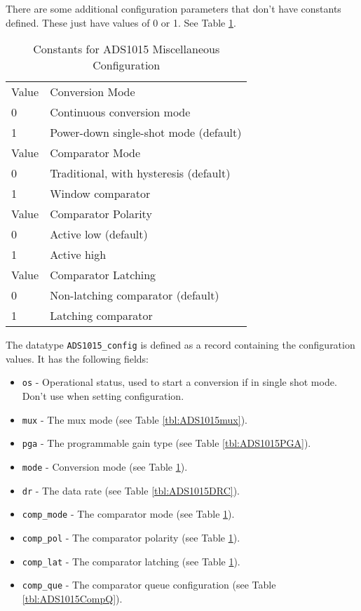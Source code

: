 \documentclass[10pt, openany]{book}
\newcommand{\datatype}[1]{\texttt{#1}}
\begin{document}
There are some additional configuration parameters that don't have constants defined.  These just have values of 0 or 1.  See Table \ref{tbl:ADS1015Misc}.

\begin{table}[!h]
\begin{center}
  \begin{tabular}{l|l}
    Value & Conversion Mode \\
    0 & Continuous conversion mode \\
    1 & Power-down single-shot mode (default) \\
    \hline
    Value & Comparator Mode \\
    0 & Traditional, with hysteresis (default) \\
    1 & Window comparator \\
    \hline
    Value & Comparator Polarity \\
    0 & Active low (default) \\
    1 & Active high \\
    \hline
    Value & Comparator Latching \\
    0 & Non-latching comparator (default) \\
    1 & Latching comparator \\
  \end{tabular}
  \caption{Constants for ADS1015 Miscellaneous Configuration}
  \label{tbl:ADS1015Misc}
\end{center}
\end{table}

The datatype \datatype{ADS1015\_config} is defined as a record containing the configuration values.  It has the following fields:
\begin{itemize}
    \item \datatype{os} - Operational status, used to start a conversion if in single shot mode.  Don't use when setting configuration.
    \item \datatype{mux} - The mux mode (see Table \ref{tbl:ADS1015mux}).
    \item \datatype{pga} - The programmable gain type (see Table \ref{tbl:ADS1015PGA}).
    \item \datatype{mode} - Conversion mode (see Table \ref{tbl:ADS1015Misc}).
    \item \datatype{dr} - The data rate (see Table \ref{tbl:ADS1015DRC}).
    \item \datatype{comp\_mode} - The comparator mode (see Table \ref{tbl:ADS1015Misc}).
    \item \datatype{comp\_pol} - The comparator polarity (see Table \ref{tbl:ADS1015Misc}).
    \item \datatype{comp\_lat} - The comparator latching (see Table \ref{tbl:ADS1015Misc}).
    \item \datatype{comp\_que} - The comparator queue configuration  (see Table \ref{tbl:ADS1015CompQ}).
\end{itemize}
\end{document}
